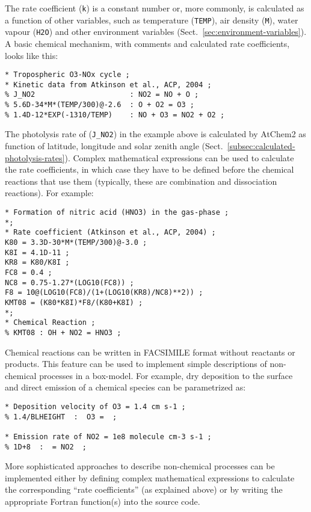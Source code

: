 The rate coefficient (\texttt{k}) is a constant number or, more
commonly, is calculated as a function of other variables, such as
temperature (\texttt{TEMP}), air density (\texttt{M}), water vapour
(\texttt{H2O}) and other environment variables
(Sect.~\ref{sec:environment-variables}). A basic chemical mechanism,
with comments and calculated rate coefficients, looks like this:

\begin{verbatim}
* Tropospheric O3-NOx cycle ;
* Kinetic data from Atkinson et al., ACP, 2004 ;
% J_NO2                      : NO2 = NO + O ;
% 5.6D-34*M*(TEMP/300)@-2.6  : O + O2 = O3 ;
% 1.4D-12*EXP(-1310/TEMP)    : NO + O3 = NO2 + O2 ;
\end{verbatim}

The photolysis rate of  (\texttt{J\_NO2}) in the example above
is calculated by AtChem2 as function of latitude, longitude and solar
zenith angle (Sect.~\ref{subsec:calculated-photolysis-rates}).
Complex mathematical expressions can be used to calculate the rate
coefficients, in which case they have to be defined before the
chemical reactions that use them (typically, these are combination and
dissociation reactions). For example:

\begin{verbatim}
* Formation of nitric acid (HNO3) in the gas-phase ;
*;
* Rate coefficient (Atkinson et al., ACP, 2004) ;
K80 = 3.3D-30*M*(TEMP/300)@-3.0 ;
K8I = 4.1D-11 ;
KR8 = K80/K8I ;
FC8 = 0.4 ;
NC8 = 0.75-1.27*(LOG10(FC8)) ;
F8 = 10@(LOG10(FC8)/(1+(LOG10(KR8)/NC8)**2)) ;
KMT08 = (K80*K8I)*F8/(K80+K8I) ;
*;
* Chemical Reaction ;
% KMT08 : OH + NO2 = HNO3 ;
\end{verbatim}

Chemical reactions can be written in FACSIMILE format without
reactants or products. This feature can be used to implement simple
descriptions of non-chemical processes in a box-model. For example,
dry deposition to the surface and direct emission of a chemical
species can be parametrized as:

\begin{verbatim}
* Deposition velocity of O3 = 1.4 cm s-1 ;
% 1.4/BLHEIGHT  :  O3 =  ;

* Emission rate of NO2 = 1e8 molecule cm-3 s-1 ;
% 1D+8  :  = NO2  ;
\end{verbatim}

More sophisticated approaches to describe non-chemical processes can
be implemented either by defining complex mathematical expressions to
calculate the corresponding ``rate coefficients'' (as explained above)
or by writing the appropriate Fortran function(s) into the source
code.

